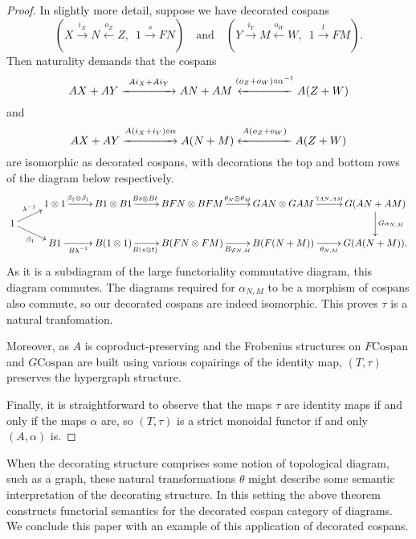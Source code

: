 \begin{proof}
In slightly more detail, suppose we have decorated cospans
\[
  (X \stackrel{i_X}\longrightarrow N
\stackrel{o_Z}\longleftarrow Z,\enspace 1 \stackrel{s}\longrightarrow FN) \quad
\textrm{and} \quad (Y \stackrel{i_Y}\longrightarrow M
\stackrel{o_W}\longleftarrow W,\enspace 1 \stackrel{t}\longrightarrow FM).
\]
Then naturality demands that the cospans
\[
 AX+AY \stackrel{Ai_X+Ai_Y}{\xrightarrow{\hspace*{1.5cm}}} AN+AM
 \stackrel{(o_Z+o_W)\circ\alpha^{-1}}{\xleftarrow{\hspace*{1.5cm}}} A(Z+W)
\]
and
\[
 AX+AY \stackrel{A(i_X+i_Y)\circ\alpha}{\xrightarrow{\hspace*{1.5cm}}} A(N+M)
 \stackrel{A(o_Z+o_W)}{\xleftarrow{\hspace*{1.5cm}}} A(Z+W)
\]
are isomorphic as decorated cospans, with decorations the top and bottom rows of
the diagram below respectively.
\[
  \xymatrixrowsep{0.5pc}
  \xymatrix{
    & 1 \otimes 1 \ar[r]^(.4){\beta_1 \otimes \beta_1} & B1 \otimes B1 \ar[r]^(.4){Bs
    \otimes Bt} & BFN \otimes BFM \ar[r]^{\theta_N \otimes \theta_M} & GAN \otimes
    GAM \ar[r]^{\gamma_{AN,AM}} & G(AN+AM) \ar[dd]^{G\alpha_{N,M}} \\
    1 \ar[ur]^{\lambda^{-1}} \ar[dr]_{\beta_1} \\
    & B1 \ar[r]_(.4){B\lambda^{-1}} & B(1 \otimes 1) \ar[r]_(.4){B(s\otimes t)} & B(FN
    \otimes FM) \ar[r]_{B\varphi_{N,M}} & B(F(N+M))
    \ar[r]_{\theta_{N,M}} & G(A(N+M)).
  }
\]
As it is a subdiagram of the large functoriality commutative diagram, this
diagram commutes. The diagrams required for $\alpha_{N,M}$ to be a morphism of
cospans also commute, so our decorated cospans are indeed isomorphic. This
proves $\tau$ is a natural tranfomation.  
  
  Moreover, as $A$ is
  coproduct-preserving and the Frobenius structures on $F\mathrm{Cospan}$ and
  $G\mathrm{Cospan}$ are built using various copairings of the identity map,
  $(T,\tau)$ preserves the hypergraph structure.

  Finally, it is straightforward to observe that the maps $\tau$ are identity
  maps if and only if the maps $\alpha$ are, so $(T,\tau)$ is a strict monoidal
  functor if and only $(A,\alpha)$ is.
\end{proof}

When the decorating structure comprises some notion of topological diagram, such
as a graph, these natural transformations $\theta$ might describe some semantic
interpretation of the decorating structure. In this setting the above theorem
constructs functorial semantics for the decorated cospan category of diagrams.
We conclude this paper with an example of this application of decorated cospans.

